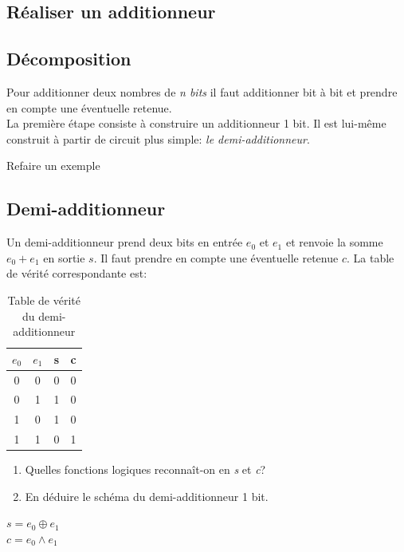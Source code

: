 \documentclass[a4paper,11pt]{article}
\begin{document}
\begin{Form}
\section{Réaliser un additionneur}
\subsection{Décomposition}
Pour additionner deux nombres de \emph{n bits} il faut additionner bit à bit et prendre en compte une éventuelle retenue.\\
La première étape consiste à construire un additionneur 1 bit. Il est lui-même construit à partir de circuit plus simple: \emph{le demi-additionneur}.
\begin{commentprof}
Refaire un exemple
\end{commentprof}
\subsection{Demi-additionneur}
Un demi-additionneur prend deux bits en entrée $e_0$ et $e_1$ et renvoie la somme $e_0+e_1$ en sortie $s$. Il faut prendre en compte une éventuelle retenue $c$. La table de vérité correspondante est:
\begin{table}[!h]
\begin{center}
\begin{tabular}{|cc||cc|}
\hline 
$e_0$ & $e_1$ & s & c \\ 
\hline 
0 & 0 & 0 & 0 \\ 
\hline 
0 & 1 & 1 & 0\\ 
\hline 
1 & 0 & 1 & 0\\
\hline 
1 & 1 & 0 & 1\\
\hline 
\end{tabular}
\caption{\label{demi}Table de vérité du demi-additionneur}
\end{center}
\end{table} 
\begin{activite}
\begin{enumerate}
\item Quelles fonctions logiques reconnaît-on en \emph{s} et \emph{c}?
\item En déduire le schéma du demi-additionneur 1 bit.
\end{enumerate}
\end{activite}
\begin{commentprof}
\noindent$s=e_0\oplus e_1$\\
$c=e_0\land e_1$
\end{commentprof}

\end{Form}
\end{document}
